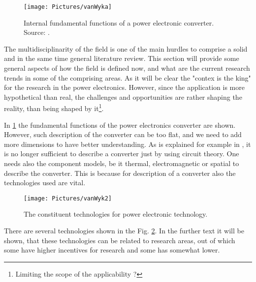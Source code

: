 \documentclass[]{scrartcl}
\begin{document}
\begin{figure}[h!]
\centering
\texttt{[image: Pictures/vanWyka]}
\caption{Internal fundamental functions of a power electronic converter. Source: \cite{Wyk2012}.}
\label{fig:vanwyka}
\end{figure}


The multidisciplinarity of the field is one of the main hurdles to comprise a solid and in the same time general literature review. This section will provide some general aspects of how the field is defined now, and what are the current research trends in some of the comprising areas. As it will be clear the "contex is the king" for the research in the power electronics.  However, since the application is more hypothetical than real, the challenges and opportunities are rather shaping the reality, than being shaped by it\footnote{Limiting the scope of the applicability ?}. 

In \ref{fig:vanwyka} the fundamental functions of the power electronics converter are shown. However, such description of the converter can be too flat, and we need to add more dimensions to have better understanding. As is explained for example in \cite{Ferreira2001}, it is no longer sufficient to describe a converter just by using circuit theory. One needs also the component models, be it thermal, electromagnetic or spatial to describe the converter. This is because for description of a converter  also the technologies used are vital. 

\begin{figure}[h!]
\centering
\texttt{[image: Pictures/vanWyk2]}
\caption{The constituent technologies for power electronic technology.}
\label{fig:vanwyk2}
\end{figure}


There are several technologies shown in the Fig. \ref{fig:vanwyk2}. In the further text it will be shown, that these technologies can be related to research areas, out of which some have higher incentives for research and some has somewhat lower. 
\end{document}
